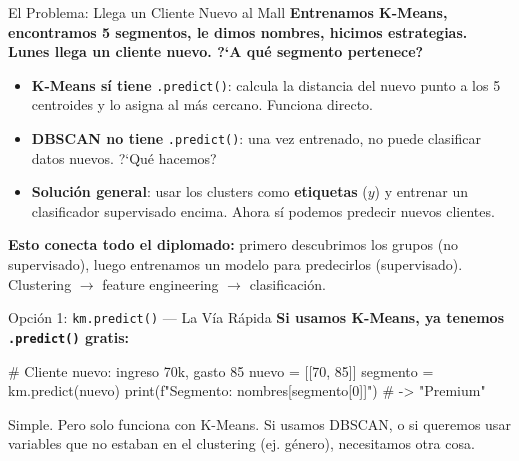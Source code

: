 \documentclass[aspectratio=169, 11pt]{beamer}
\begin{document}
\begin{frame}{El Problema: Llega un Cliente Nuevo al Mall}
  \vspace{-4pt}
  {\footnotesize\color{arcaDark}\bfseries
    Entrenamos K-Means, encontramos 5 segmentos, le dimos nombres,
    hicimos estrategias. Lunes llega un cliente nuevo.
    ?`A qu\'e segmento pertenece?}

  \vspace{6pt}
  {\footnotesize
  \begin{itemize}\setlength{\itemsep}{5pt}
    \item[{\color{codeGreen}\scriptsize\faCheckCircle}]
      \textbf{K-Means s\'i tiene} \texttt{.predict()}: calcula la
      distancia del nuevo punto a los 5 centroides y lo asigna al
      m\'as cercano. Funciona directo.
    \item[{\color{arcaRed}\scriptsize\faTimesCircle}]
      \textbf{DBSCAN no tiene} \texttt{.predict()}: una vez entrenado,
      no puede clasificar datos nuevos. ?`Qu\'e hacemos?
    \item[{\color{codeBlue}\scriptsize\faArrowRight}]
      \textbf{Soluci\'on general}: usar los clusters como
      \textbf{etiquetas} ($y$) y entrenar un clasificador supervisado
      encima. Ahora s\'i podemos predecir nuevos clientes.
  \end{itemize}
  }

  \vspace{4pt}
  \begin{tcolorbox}[colback=codePurple!8, colframe=codePurple, boxrule=0.5pt, arc=2pt,
    left=6pt, right=6pt, top=4pt, bottom=4pt]
    {\scriptsize\color{arcaDark}
    \faLightbulb\hspace{4pt}\textbf{Esto conecta todo el diplomado:}
    primero descubrimos los grupos (no supervisado), luego
    entrenamos un modelo para predecirlos (supervisado).
    Clustering $\to$ feature engineering $\to$ clasificaci\'on.}
  \end{tcolorbox}
\end{frame}

\begin{frame}[fragile,shrink=18]{Opci\'on 1: \texttt{km.predict()} --- La V\'ia R\'apida}
  \vspace{-4pt}
  {\footnotesize\color{arcaDark}\bfseries
    Si usamos K-Means, ya tenemos \texttt{.predict()} gratis:}

  \vspace{4pt}
  \begin{pyblock}
# Cliente nuevo: ingreso 70k, gasto 85
nuevo = [[70, 85]]
segmento = km.predict(nuevo)
print(f"Segmento: {nombres[segmento[0]]}")
# -> "Premium"
  \end{pyblock}

  \vspace{4pt}
  {\scriptsize\color{arcaDark}
    \faCheckCircle\hspace{4pt} Simple. Pero solo funciona con K-Means.
    Si usamos DBSCAN, o si queremos usar variables que no estaban en
    el clustering (ej. g\'enero), necesitamos otra cosa.}
\end{frame}
\end{document}
